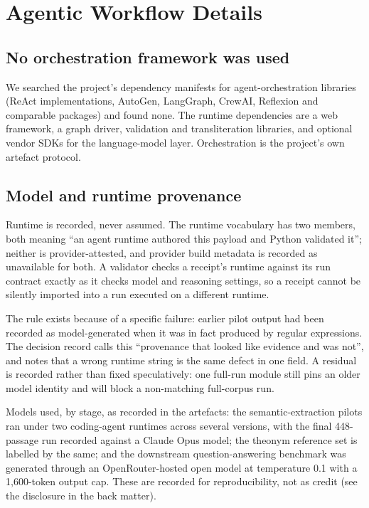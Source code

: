 \section{Agentic Workflow Details}
\label{sec:appendix-agentic}

\subsection{No orchestration framework was used}

We searched the project's dependency manifests for agent-orchestration libraries
(ReAct implementations, AutoGen, LangGraph, CrewAI, Reflexion and comparable
packages) and found none. The runtime dependencies are a web framework, a graph
driver, validation and transliteration libraries, and optional vendor \mbox{SDK}s for
the language-model layer. Orchestration is the project's own artefact protocol.

\subsection{Model and runtime provenance}

Runtime is recorded, never assumed. The runtime vocabulary has two members, both
meaning ``an agent runtime authored this payload and Python validated it''; neither
is provider-attested, and provider build metadata is recorded as unavailable for
both. A validator checks a receipt's runtime against its run contract exactly as it
checks model and reasoning settings, so a receipt cannot be silently imported into a
run executed on a different runtime.

The rule exists because of a specific failure: earlier pilot output had been recorded
as model-generated when it was in fact produced by regular expressions. The decision
record calls this ``provenance that looked like evidence and was not'', and notes
that a wrong runtime string is the same defect in one field. A residual is recorded
rather than fixed speculatively: one full-run module still pins an older model
identity and will block a non-matching full-corpus run.

Models used, by stage, as recorded in the artefacts: the semantic-extraction pilots
ran under two coding-agent runtimes across several versions, with the final
448-passage run recorded against a Claude Opus model; the theonym reference set is
labelled  by the same; and the downstream
question-answering benchmark was generated through an OpenRouter-hosted open model at
temperature 0.1 with a 1{,}600-token output cap. These are recorded for
reproducibility, not as credit (see the disclosure in the back matter).


